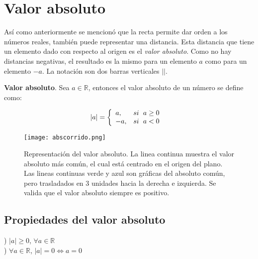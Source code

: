 \section{Valor absoluto}
Así como anteriormente se mencionó que la recta permite dar orden a los números reales, también puede representar una distancia. Esta distancia que tiene un elemento dado con respecto al origen es el \textit{valor absoluto}. Como no hay distancias negativas, el resultado es la mismo para un elemento $a$ como para un elemento $-a$. La notación son dos barras verticales $||$.

\begin{mydef}
\textbf{Valor absoluto}. Sea $a\in\mathbb{R}$, entonces el valor absoluto de un número se define como:\

$$ |a|= \left\{\begin{array}{ll}
a, & si \hspace{6px} a\geq 0\\
-a, & si \hspace{6px} a<0 
\end{array} \hspace{6px} \right.$$
\label{absdef}
\end{mydef}

\begin{center}
	\begin{figure}[h!]
		\centering
		\texttt{[image: abscorrido.png]}
		\caption[Representación del valor absoluto]{Representación del valor absoluto. La linea continua muestra el valor absoluto más común, el cual está centrado en el origen del plano. Las lineas continuas verde y azul son gráficas del absoluto común, pero trasladados en 3 unidades hacia la derecha e izquierda. Se valida que el valor absoluto siempre es positivo.}
		\label{abscorrido}
	\end{figure}
\end{center}

\subsection{Propiedades del valor absoluto}
\label{Propabs}
) $|a|\geq 0$, $\forall a\in\mathbb{R}$ \\

) $\forall a\in\mathbb{R}$, $|a|=0\Leftrightarrow a=0$ \\

